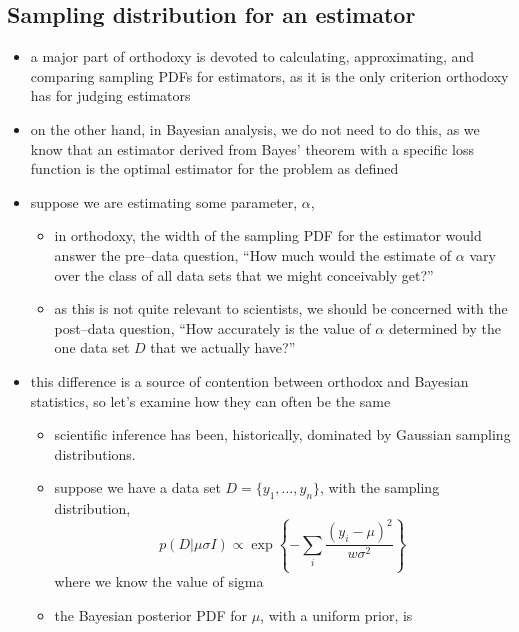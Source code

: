 \documentclass[../jaynes_prob_theory_notes.tex]{subfiles}
\begin{document}
        \subsection{Sampling distribution for an estimator}
            \begin{itemize} 
                \item a major part of orthodoxy is devoted to calculating, approximating, and comparing sampling PDFs for estimators, as it is the only criterion orthodoxy has for judging estimators
                \item on the other hand, in Bayesian analysis, we do not need to do this, as we know that an estimator derived from Bayes' theorem with a specific loss function is the optimal estimator for the problem as defined
                \item suppose we are estimating some parameter, \(\alpha\),
                    \begin{itemize} 
                        \item in orthodoxy, the width of the sampling PDF for the estimator would answer the pre--data question, ``How much would the estimate of \(\alpha\) vary over the class of all data sets that we might conceivably get?''
                        \item as this is not quite relevant to scientists, we should be concerned with the post--data question, ``How accurately is the value of \(\alpha\) determined by the one data set \(D\) that we actually have?''
                    \end{itemize}
                \item this difference is a source of contention between orthodox and Bayesian statistics, so let's examine how they can often be the same
                    \begin{itemize} 
                        \item scientific inference has been, historically, dominated by Gaussian sampling distributions.
                        \item suppose we have a data set \(D = \{y_1, \ldots, y_n\}\), with the sampling distribution,
                            \begin{equation*} 
                                p(D|\mu \sigma I) \propto \exp \left \{ -\sum\limits_i \frac{{(y_i - \mu)}^2}{w {\sigma}^2} \right \}
                            \end{equation*}
                            where we know the value of sigma
                        \item the Bayesian posterior PDF for \(\mu\), with a uniform prior, is

\end{itemize}
\end{itemize}
\end{document}
